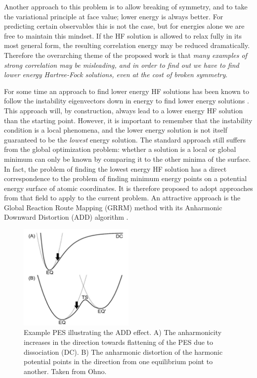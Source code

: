 \documentclass{revtex4}
\begin{document}
    Another approach to this problem is to allow breaking of symmetry, and to take the variational 
    principle at face value; lower 
    energy is 
    always better. For predicting certain observables this is not the case, but for energies alone 
    we are free 
    to maintain this mindset. If the HF solution is allowed to relax fully in its most general 
    form, the resulting correlation energy may be reduced dramatically. Therefore the overarching 
    theme of the proposed work is that 
    \emph{many 
    examples of strong correlation may be misleading, and in order to find out we have to find 
    lower 
    energy Hartree-Fock solutions, even at the cost of broken symmetry}.    
    
    For some time an approach to find lower energy HF solutions has been known to follow the 
    instability eigenvectors down in energy 
    to find lower energy solutions \cite{Seeger1977}. This approach will, by construction, always 
    lead to a lower energy HF solution than the starting point. However, it is important to 
    remember that the instability condition is a local phenomena, and the lower energy solution is 
    not itself guaranteed to be the \emph{lowest} energy solution. The standard approach still 
    suffers 
    from the global optimization problem: whether a solution is a local or global minimum can only 
    be known by comparing it to the other minima of the surface. In fact, the problem of finding 
    the lowest energy HF solution has a direct correspondence to the problem of finding minimum 
    energy points on a potential energy surface of atomic coordinates. It is therefore proposed to 
    adopt approaches from that field to apply to the current problem. An attractive approach is the 
    Global Reaction Route Mapping (GRRM) method with its Anharmonic Downward Distortion (ADD) 
    algorithm \cite{Ohno2006, Ohno2016}. 
    
    \begin{figure}
      \centering
      \includegraphics[width=0.5\textwidth]{../figures/ADD.png}
      \caption{Example PES illustrating the ADD effect. A) The anharmonicity increases in the 
      direction towards flattening of the PES due to dissociation (DC). B) The anharmonic 
      distortion of the 
      harmonic potential points in the direction from one equilibrium point to another. Taken from 
      Ohno\cite{Ohno2016}.}
      \label{add}
    \end{figure}
    
\end{document}
